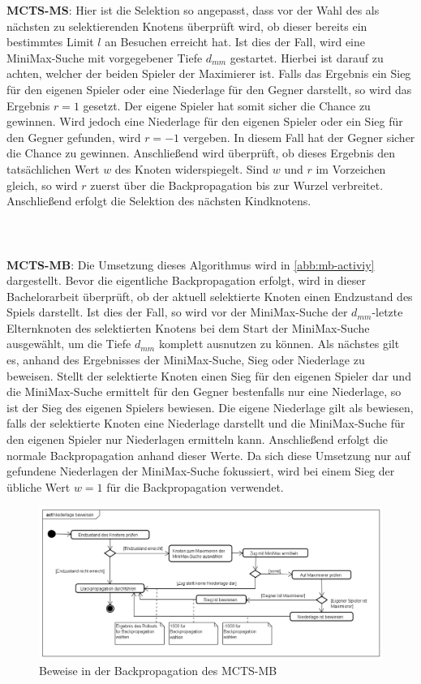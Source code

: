 \documentclass[12pt,a4paper,bibliography=totocnumbered,listof=totocnumbered]{article}
\begin{document}
\textbf{MCTS-MS}: Hier ist die Selektion so angepasst, dass vor der Wahl des als nächsten zu selektierenden Knotens überprüft wird, ob dieser bereits ein bestimmtes Limit $l$ an Besuchen erreicht hat. Ist dies der Fall, wird eine MiniMax-Suche mit vorgegebener Tiefe $d_{mm}$ gestartet. Hierbei ist darauf zu achten, welcher der beiden Spieler der Maximierer ist. Falls das Ergebnis ein Sieg für den eigenen Spieler oder eine Niederlage für den Gegner darstellt, so wird das Ergebnis $r = 1$ gesetzt. Der eigene Spieler hat somit sicher die Chance zu gewinnen. Wird jedoch eine Niederlage für den eigenen Spieler oder ein Sieg für den Gegner gefunden, wird $r = -1$ vergeben. In diesem Fall hat der Gegner sicher die Chance zu gewinnen. Anschließend wird überprüft, ob dieses Ergebnis den tatsächlichen Wert $w$ des Knoten widerspiegelt. Sind $w$ und $r$ im Vorzeichen gleich, so wird $r$ zuerst über die Backpropagation bis zur Wurzel verbreitet. Anschließend erfolgt die Selektion des nächsten Kindknotens.\\\\\\\\
\textbf{MCTS-MB}: Die Umsetzung dieses Algorithmus wird in \autoref{abb:mb-activiy} dargestellt. Bevor die eigentliche Backpropagation erfolgt, wird in dieser Bachelorarbeit überprüft, ob der aktuell selektierte Knoten einen Endzustand des Spiels darstellt. Ist dies der Fall, so wird vor der MiniMax-Suche der $d_{mm}$-letzte Elternknoten des selektierten Knotens bei dem Start der MiniMax-Suche ausgewählt, um die Tiefe $d_{mm}$ komplett ausnutzen zu können. Als nächstes gilt es, anhand des Ergebnisses der MiniMax-Suche, Sieg oder Niederlage zu beweisen. Stellt der selektierte Knoten einen Sieg für den eigenen Spieler dar und die MiniMax-Suche ermittelt für den Gegner bestenfalls nur eine Niederlage, so ist der Sieg des eigenen Spielers bewiesen. Die eigene Niederlage gilt als bewiesen, falls der selektierte Knoten eine Niederlage darstellt und die MiniMax-Suche für den eigenen Spieler nur Niederlagen ermitteln kann. Anschließend erfolgt die normale Backpropagation anhand dieser Werte. Da sich diese Umsetzung nur auf gefundene Niederlagen der MiniMax-Suche fokussiert, wird bei einem Sieg der übliche Wert $w=1$ für die Backpropagation verwendet.

\begin{figure}[h]
\centering
\includegraphics[scale=0.5]{pics/MB-activity.png}
\caption{Beweise in der Backpropagation des MCTS-MB}
\label{abb:mb-activiy}
\end{figure}
\end{document}

